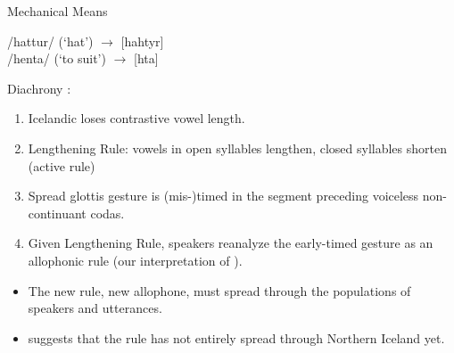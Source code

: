 \documentclass[hyperref={pdfpagelabels=false}]{beamer}
\begin{document}
\begin{frame}{Mechanical Means}

		\begin{center}
		/hattur/ (`hat') $\rightarrow$ [hahtyr]\\ /henta/ (`to suit') $\rightarrow$ [h\textepsilon{}ta]
		\end{center}
		 Diachrony \citep{kristjan1980, kristjan1986}:
		\begin{enumerate}
			\item Icelandic loses contrastive vowel length.
			\item Lengthening Rule: vowels in open syllables lengthen, closed syllables shorten (active rule)
			\item Spread glottis gesture is (mis-)timed in the segment preceding voiceless non-continuant codas.
			\item Given Lengthening Rule, speakers reanalyze the early-timed gesture as an allophonic rule (our interpretation of \citealt{kristjan1986}).
		\end{enumerate}
		\begin{itemize}
		\item The new rule, new allophone, must spread through the populations of speakers and utterances.
		\item \citet{kristjan1986} suggests that the rule has not entirely spread through Northern Iceland yet.
	\end{itemize}

\end{frame}
\end{document}
